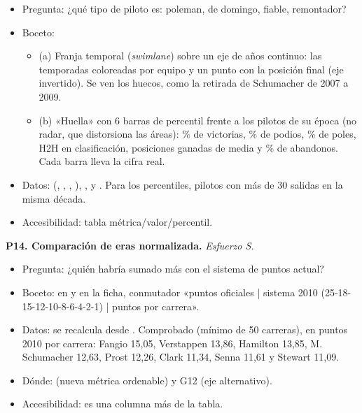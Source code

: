 \begin{itemize}
\item Pregunta: ¿qué tipo de piloto es: poleman, de domingo, fiable, remontador?
\item Boceto:
\begin{itemize}
\item (a) Franja temporal (\emph{swimlane}) sobre un eje de años continuo: las temporadas coloreadas por equipo y un punto con la posición final (eje invertido). Se ven los huecos, como la retirada de Schumacher de 2007 a 2009.
\item (b) «Huella» con 6 barras de percentil frente a los pilotos de su época (no radar, que distorsiona las áreas): \% de victorias, \% de podios, \% de poles, H2H en clasificación, posiciones ganadas de media y \% de abandonos. Cada barra lleva la cifra real.
\end{itemize}
\item Datos:  (, , , ), ,  y . Para los percentiles, pilotos con más de 30 salidas en la misma década.
\item Accesibilidad: tabla métrica/valor/percentil.
\end{itemize}

\textbf{P14. Comparación de eras normalizada.} \emph{Esfuerzo S.}

\begin{itemize}
\item Pregunta: ¿quién habría sumado más con el sistema de puntos actual?
\item Boceto: en  y en la ficha, conmutador «puntos oficiales | sistema 2010 (25-18-15-12-10-8-6-4-2-1) | puntos por carrera».
\item Datos: se recalcula desde . Comprobado (mínimo de 50 carreras), en puntos 2010 por carrera: Fangio 15,05, Verstappen 13,86, Hamilton 13,85, M. Schumacher 12,63, Prost 12,26, Clark 11,34, Senna 11,61 y Stewart 11,09.
\item Dónde:  (nueva métrica ordenable) y G12 (eje alternativo).
\item Accesibilidad: es una columna más de la tabla.
\end{itemize}

